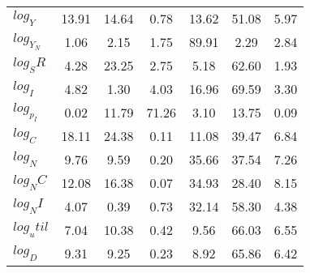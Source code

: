 \begin{center}
\begin{longtable}{lcccccc}
$log_Y     $	 & 	       13.91	 & 	       14.64	 & 	        0.78	 & 	       13.62	 & 	       51.08	 & 	        5.97 \\ 
$log_Y_N   $	 & 	        1.06	 & 	        2.15	 & 	        1.75	 & 	       89.91	 & 	        2.29	 & 	        2.84 \\ 
$log_SR    $	 & 	        4.28	 & 	       23.25	 & 	        2.75	 & 	        5.18	 & 	       62.60	 & 	        1.93 \\ 
$log_I     $	 & 	        4.82	 & 	        1.30	 & 	        4.03	 & 	       16.96	 & 	       69.59	 & 	        3.30 \\ 
$log_p_I   $	 & 	        0.02	 & 	       11.79	 & 	       71.26	 & 	        3.10	 & 	       13.75	 & 	        0.09 \\ 
$log_C     $	 & 	       18.11	 & 	       24.38	 & 	        0.11	 & 	       11.08	 & 	       39.47	 & 	        6.84 \\ 
$log_N     $	 & 	        9.76	 & 	        9.59	 & 	        0.20	 & 	       35.66	 & 	       37.54	 & 	        7.26 \\ 
$log_NC    $	 & 	       12.08	 & 	       16.38	 & 	        0.07	 & 	       34.93	 & 	       28.40	 & 	        8.15 \\ 
$log_NI    $	 & 	        4.07	 & 	        0.39	 & 	        0.73	 & 	       32.14	 & 	       58.30	 & 	        4.38 \\ 
$log_util  $	 & 	        7.04	 & 	       10.38	 & 	        0.42	 & 	        9.56	 & 	       66.03	 & 	        6.55 \\ 
$log_D     $	 & 	        9.31	 & 	        9.25	 & 	        0.23	 & 	        8.92	 & 	       65.86	 & 	        6.42 \\ 
\end{longtable}
 \end{center}
